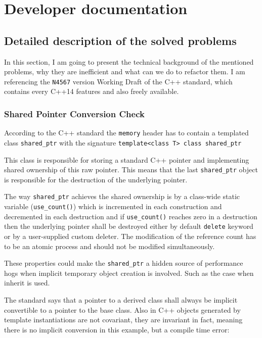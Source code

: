 \section{Developer documentation}
\subsection{Detailed description of the solved problems}
\par In this section, I am going to present the technical background of the mentioned problems, why they are inefficient and what can we do to refactor them. I am referencing the \verb|N4567|\cite{cpp_standard} version Working Draft of the C++ standard, which contains every C++14 features and also freely available.
\subsubsection{Shared Pointer Conversion Check}
\par According to the C++ standard the \verb|memory| header has to contain a templated class \verb|shared_ptr| with the signature \verb|template<class T> class shared_ptr|\cite[\S20.8.2.2]{cpp_standard} \medskip
\par This class is responsible for storing a standard C++ pointer and implementing shared ownership of this raw pointer. This means that the last \verb|shared_ptr| object is responsible for the destruction of the underlying pointer. \medskip
\par The way \verb|shared_ptr| achieves the shared ownership is by a class-wide static variable (\verb|use_count()|) which is incremented in each construction and decremented in each destruction and if \verb|use_count()|  reaches zero in a destruction then the underlying pointer shall be destroyed either by default \verb|delete| keyword or by a user-supplied custom deleter. The modification of the reference count has to be an atomic process and should not be modified simultaneously\cite[\S20.8.2.2 4.]{cpp_standard}. \medskip
\par These properties could make the \verb|shared_ptr| a hidden source of performance hogs when implicit temporary object creation is involved.  Such as the case when inherit is used. \medskip
\par The standard says that a pointer to a derived class shall always be implicit convertible to a pointer to the base class\cite[\S4.10 3.]{cpp_standard}. Also in C++ objects generated  by template instantiations are not covariant, they are invariant in fact, meaning there is no implicit conversion in this example, but a compile time error:
